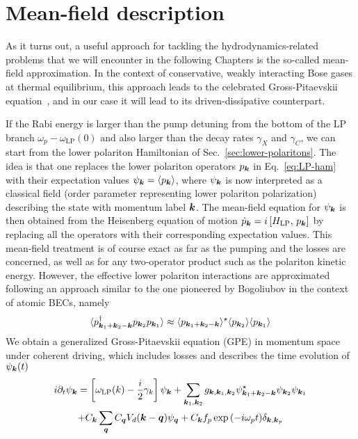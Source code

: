 \section{Mean-field description}
\label{sec:mean-field}

As it turns out, a useful approach for tackling the
hydrodynamics-related problems that we will encounter in the following
Chapters is the so-called mean-field approximation. In the context of
conservative, weakly interacting Bose gases at thermal equilibrium,
this approach leads to the celebrated Gross-Pitaevskii
equation~\cite{9780198507192}, and in our case it will lead to its
driven-dissipative counterpart.

If the Rabi energy is larger than the pump detuning from the bottom of
the LP branch $\omega_p - \omega_{\text{LP}}(0)$ and also larger than
the decay rates $\gamma_X$ and $\gamma_C$, we can start from the lower
polariton Hamiltonian of Sec.~\ref{sec:lower-polaritons}.  The idea
is that one replaces the lower polariton operators $p_{\bm{k}}$ in
Eq.~\eqref{eq:LP-ham} with their expectation values
$\psi_{\bm{k}} = \langle p_{\bm{k}} \rangle$, where $\psi_{\bm{k}}$ is now
interpreted as a classical field (order parameter representing lower
polariton polarization) describing the state with momentum label
$\bm{k}$. The mean-field equation for $\psi_{\bm{k}}$ is then obtained from
the Heisenberg equation of motion
$\dot{p}_{\bm{k}} =i \left[ H_{\text{LP}},\, p_{\bm{k}} \right]$ by
replacing all the operators with their corresponding expectation
values. This mean-field treatment is of course exact as far as the
pumping and the losses are concerned, as well as for any two-operator
product such as the polariton kinetic energy. However, the effective
lower polariton interactions are approximated following an approach
similar to the one pioneered by Bogoliubov in the context of atomic
BECs, namely
%
\begin{equation}\label{eq:mean-field-approx}
  \langle p^{\dagger}_{\bm{k}_1 + \bm{k}_2 - \bm{k}} p_{\bm{k}_2} p_{\bm{k}_1} \rangle \approx \langle p_{\bm{k}_1 + \bm{k}_2 - \bm{k}} \rangle^{\star} \langle p_{\bm{k}_2} \rangle \langle p_{\bm{k}_1} \rangle
\end{equation}
% 
We obtain a generalized Gross-Pitaevskii equation (GPE) in momentum
space under coherent driving, which includes losses and describes the
time evolution of $\psi_{\bm{k}}(t)$
%
\begin{multline}\label{eq:mom-GPE}
  i\partial_t\psi_{\bm{k}} = \left[\omega_{\text{LP}}(k) - \frac{i}{2} \gamma_k\right]\psi_{\bm{k}} + \sum_{\bm{k}_1,\bm{k}_2} g_{\bm{k},\bm{k}_1,\bm{k}_2} \psi^{\star}_{\bm{k}_1 + \bm{k}_2 - \bm{k}} \psi_{\bm{k}_2} \psi_{\bm{k}_1}\\
  + C_{\bm{k}} \sum_{\bm{q}} C_{\bm{q}} V_d(\bm{k} - \bm{q}) \psi_{\bm{q}}
  + C_{\bm{k}} f_p \exp{\left(-i \omega_pt\right)} \delta_{\bm{k},\bm{k}_{p}}
\end{multline}
